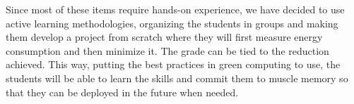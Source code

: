 \documentclass[sigconf]{acmart}
\begin{document}
Since most of these items require hands-on experience, we have decided to use
active learning methodologies, organizing the students in groups and
making them develop a project from scratch where they will first measure energy
consumption and then minimize it. The grade can be tied to the
reduction achieved. This way, putting the best practices in green computing
to use, the students will be able to learn the skills and commit them to muscle
memory so that they can be deployed in the future when needed.



\end{document}
